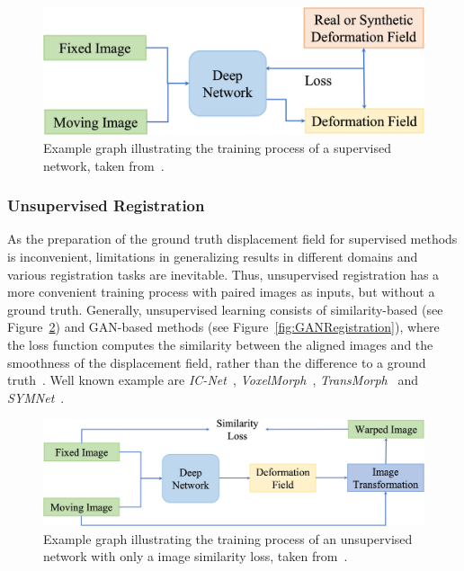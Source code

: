 \begin{figure}[h] %
	\centering
	\graphicspath{{images/}{\main/images/}}
	\includegraphics[width=\linewidth]{SupervisedRegistrationGraph.jpg} 
	\caption{Example graph illustrating the training process of a supervised network, taken from~\cite{Zou2022}.}
	\label{fig:SupervisedRegistration}
\end{figure}


\subsubsection{Unsupervised Registration} \label{SubSubSec:UnsupervisedRegistration}
As the preparation of the ground truth displacement field for supervised methods is inconvenient, limitations in generalizing results in different domains and various registration tasks are inevitable. Thus, unsupervised registration has a more convenient training process with paired images as inputs, but without a ground truth. Generally, unsupervised learning consists of similarity-based (see Figure~\ref{fig:UnsupervisedRegistration}) and GAN-based methods (see Figure~\ref{fig:GANRegistration}), where the loss function computes the similarity between the aligned images and the smoothness of the displacement field, rather than the difference to a ground truth~\cite{Zou2022}. Well known example are \emph{IC-Net}~\cite{IC-Net},  \emph{VoxelMorph}~\cite{Voxelmorph}, \emph{TransMorph}~\cite{TransMorph} and \emph{SYMNet}~\cite{SYM-Net}.

\begin{figure}[h] %
	\centering
	\graphicspath{{images/}{\main/images/}}
	\includegraphics[width=\linewidth]{UnsupervisedRegistrationGraph.jpg} 
	\caption{Example graph illustrating the training process of an unsupervised network with only a image similarity loss, taken from~\cite{Zou2022}.}
	\label{fig:UnsupervisedRegistration}
\end{figure}

